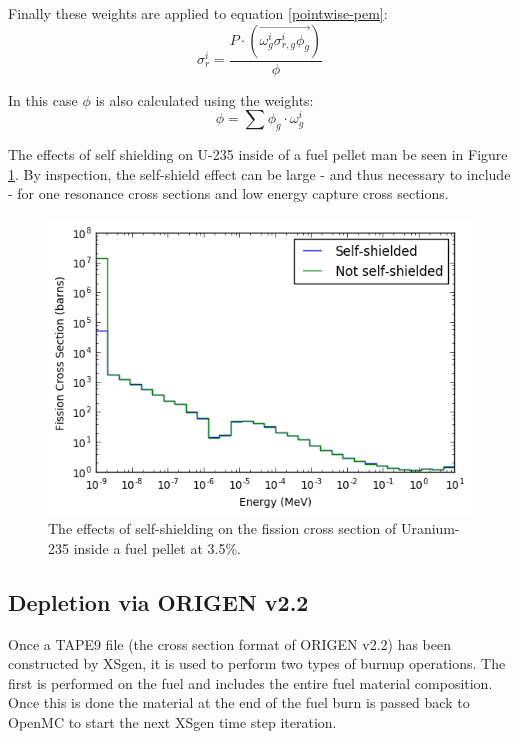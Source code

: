 \documentclass{article}
\begin{document}
Finally these weights are applied to equation \ref{pointwise-pem}:
\begin{equation}
\label{ssww}
\sigma_{r}^i=\frac{P \cdot (\overrightarrow{\omega_g^i\sigma_{r,g}^i \phi_g})}{\phi}
\end{equation}

In this case $\phi$ is also calculated using the weights:
\begin{equation}
\label{phiw}
\phi=\sum\phi_g \cdot \omega_g^i
\end{equation}

The effects of self shielding on U-235 inside of a fuel pellet man be seen in
Figure \ref{fig:index}. By inspection, the self-shield effect can be large - and thus
necessary to include - for one resonance cross sections and low energy capture cross sections.
\begin{figure}[h]
  \center
  \includegraphics[scale=0.6]{index.png}
  \caption{The effects of self-shielding on the fission cross section of Uranium-235 inside a fuel pellet at 3.5\%.}
  \label{fig:index}
\end{figure}

\subsection{Depletion via ORIGEN v2.2}
\label{sec:origen}

Once a TAPE9 file (the cross section format of ORIGEN v2.2) has been constructed by XSgen, it is
used to perform two types of burnup operations. The first is performed on the fuel and
includes the entire fuel material composition. Once this is done the material at the
end of the fuel burn is passed back to OpenMC to start the next XSgen time step iteration.
\end{document}
